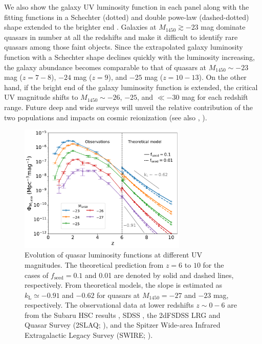 \documentclass[twocolumn, twocolappendix]{aastex63}
\newcommand{\fseed}{f_\mathrm{seed}}
\newcommand{\Muv}{M_{1450}}
\begin{document}
\begin{CJK*}{UTF8}{gbsn}
We also show the galaxy UV luminosity function in each panel
along with the fitting functions in a Schechter (dotted) and double powe-law (dashed-dotted) shape extended to the brighter end
\citep{2013MNRAS.432.2696M, 2016ApJ...819..129O, 2018ApJ...867..150M, 2019ApJ...883...99S, 2020MNRAS.493.2059B,
2021AJ....162...47B, 2022arXiv220712356D,
2022ApJS..259...20H, Harikane_2022b, Harikane_2022c, 2022arXiv220709434N}.
Galaxies at $\Muv\gtrsim -23$ mag dominate quasars in number at all the redshifts and make it 
difficult to identify rare quasars among those faint objects.
Since the extrapolated galaxy luminosity function with a Schechter shape declines quickly with the luminosity increasing,
the galaxy abundance becomes comparable to that of quasars at $\Muv \sim -23$ mag ($z=7-8$), $-24$ mag ($z=9$), and $-25$ mag ($z=10-13$).
On the other hand, if the bright end of the galaxy luminosity function is extended, the critical UV magnitude shifts to
$\Muv\sim-26$, $-25$, and $\ll -30$ mag for each redshift range.
Future deep and wide surveys will unveil the relative contribution of the two populations and impacts on cosmic reionization
(see also , \citealt{2022NatAs...6..850J}).



\begin{figure}
\centering
\includegraphics[width=80mm]{QLFmag_z.pdf}
\caption{
Evolution of quasar luminosity functions at different UV magnitudes.
The theoretical prediction from $z=6$ to $10$ for the cases of $\fseed=0.1$ and 0.01 are denoted by solid and dashed lines, respectively.
From theoretical models, the slope is estimated as $k_\mathrm{L} \simeq -0.91$ and $-0.62$ for quasars at $\Muv=-27$ and $-23$ mag, respectively.
The observational data at lower redshifts $z\sim 0-6$ are from the Subaru HSC results \citep{2018PASJ...70S..34A,2018ApJ...869..150M,2020ApJ...904...89N},
SDSS \citep{2006AJ....131.2766R,2013ApJ...768..105M},
the 2dFSDSS LRG and Quasar Survey (2SLAQ; \citealt{2009MNRAS.399.1755C}),
and the Spitzer Wide-area Infrared Extragalactic Legacy Survey (SWIRE; \citealt{2008ApJ...675...49S}).
}
\label{fig:QLFmag_z}
\vspace{5mm}
\end{figure}



\end{CJK*}
\end{document}
